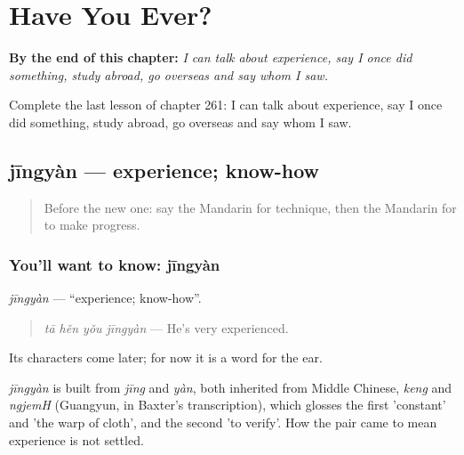 
\chapter{Have You Ever?}
\label{ch:zh-have-you-ever}

\begin{chapteropening}
\textbf{By the end of this chapter:} \emph{I can talk about experience, say I once did something, study abroad, go overseas and say whom I saw.}

Complete the last lesson of chapter 261: I can talk about experience, say I once did something, study abroad, go overseas and say whom I saw.
\end{chapteropening}

\section[jīngyàn]{jīngyàn — experience; know-how}

\label{lesson:ZH-C261-jingyan}



\begin{quote}
Before the new one: say the Mandarin for technique, then the Mandarin for to make progress.
\end{quote}

\subsection*{You'll want to know: jīngyàn}
\emph{jīngyàn} — \textquotedblleft{}experience; know-how\textquotedblright{}.

\begin{quote}
\emph{tā hěn yǒu jīngyàn} — He's very experienced.
\end{quote}

Its characters come later; for now it is a word for the ear.

\begin{cousinweb}
\emph{jīngyàn} is built from \emph{jīng} and \emph{yàn}, both inherited from Middle Chinese, \emph{keng} and \emph{ngjemH} (Guangyun, in Baxter's transcription), which glosses the first 'constant' and 'the warp of cloth', and the second 'to verify'. How the pair came to mean experience is not settled.
\end{cousinweb}

